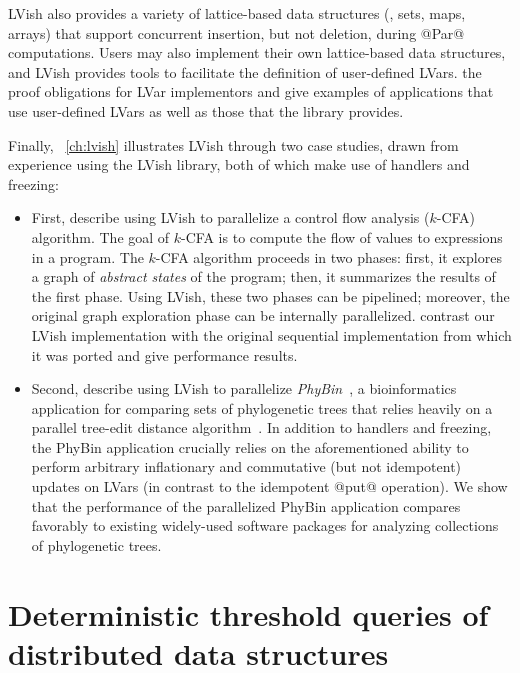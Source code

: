 LVish also provides a variety of lattice-based data structures (\eg,
sets, maps, arrays) that support concurrent insertion, but not
deletion, during @Par@ computations.  Users may also implement their own lattice-based data structures,
and LVish provides tools to facilitate the definition of user-defined
LVars.   the proof obligations for LVar
implementors and give examples of applications that use user-defined
LVars as well as those that the library provides.

Finally, ~\ref{ch:lvish}
illustrates LVish through two case studies, drawn from  experience using the LVish library, both of which
make use of handlers and freezing:
\begin{itemize}
\item First,  describe using LVish to parallelize a control flow
  analysis ($k$-CFA) algorithm.  The goal of $k$-CFA is to compute the
  flow of values to expressions in a program.  The $k$-CFA algorithm
  proceeds in two phases: first, it explores a graph of \emph{abstract
    states} of the program; then, it summarizes the results of the
  first phase.  Using LVish, these two phases can be pipelined;
  moreover, the original graph exploration phase can be internally
  parallelized.   contrast our LVish implementation with the original
  sequential implementation from which it was ported and give performance results.
\item Second,  describe using LVish to parallelize
  \emph{PhyBin}~\cite{PhyBin}, a bioinformatics application for
  comparing sets of phylogenetic trees that relies heavily on a
  parallel tree-edit distance algorithm~\cite{hashrf}.  In addition to
  handlers and freezing,
  the PhyBin application crucially relies on the aforementioned
  ability to perform arbitrary inflationary and commutative (but not idempotent) updates on
  LVars (in contrast to the idempotent @put@ operation).  We show that
  the performance of the parallelized PhyBin application compares
  favorably to existing widely-used software packages for analyzing
  collections of phylogenetic trees.
\end{itemize}

\ifdefined\DISSERTATION
\section{Deterministic threshold queries of distributed data structures}\label{s:intro-cvrdts}

